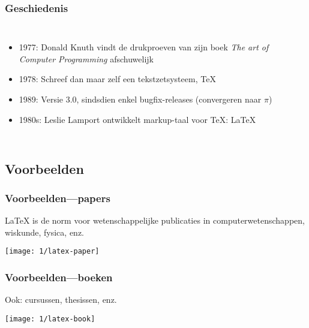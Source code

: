 \documentclass[aspectratio=169]{beamer}
\begin{document}
\begin{frame}[plain]
  \frametitle{Geschiedenis}

  \begin{columns}[c]

    \begin{itemize}
      \item<+-> 1977: Donald Knuth vindt de drukproeven van zijn boek \textit{The art of Computer Programming} afschuwelijk
      \item<+-> 1978: Schreef dan maar zelf een tekstzetsysteem, {\TeX}
      \item<+-> 1989: Versie 3.0, sindsdien enkel bugfix-releases (convergeren naar \(\pi\))
      \item<+-> 1980s: Leslie Lamport ontwikkelt markup-taal voor {\TeX}: {\LaTeX}
    \end{itemize}

    \begin{center}
    \end{center}

  \end{columns}
\end{frame}

\subsection{Voorbeelden}

\begin{frame}
  \frametitle{Voorbeelden---papers}

  {\LaTeX} is de norm voor wetenschappelijke publicaties in computerwetenschappen, wiskunde, fysica, enz.

  \begin{center}
    \texttt{[image: 1/latex-paper]}
  \end{center}

\end{frame}

\begin{frame}
  \frametitle{Voorbeelden---boeken}

  Ook: cursussen, thesissen, enz.

  \begin{center}
    \texttt{[image: 1/latex-book]}
  \end{center}

\end{frame}
\end{document}
